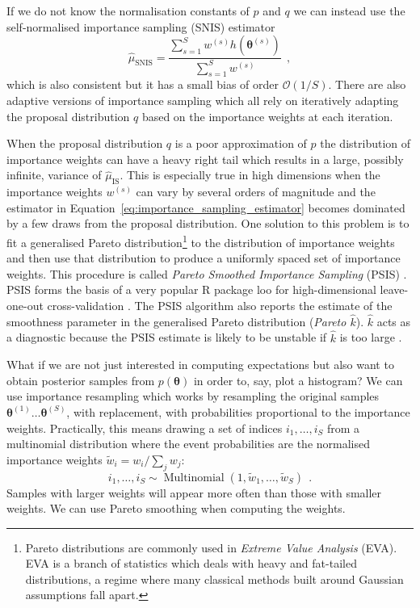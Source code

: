 \documentclass[12pt,dvipsnames]{report}
\newcommand{\ssf}[1]{\textsf{#1}}
\renewcommand{\vec}[1]{\boldsymbol{\mathbf{#1}}}
\newcommand{\hquad}{~~}
\begin{document}
If we do not know the normalisation constants of $p$ and $q$ we can instead use the 
self-normalised importance sampling (SNIS)  estimator 
\begin{equation}
    \hat{\mu}_{\mathrm{SNIS}}=\frac{\sum_{s=1}^{S} w^{(s)} h\left(\boldsymbol{\theta}^{(s)}\right)}{\sum_{s=1}^{S} w^{(s)}}
    \hquad,
\label{eq:importance_sampling_estimator}
\end{equation}
which is also consistent but it has a small bias of order $\mathcal{O}(1/S)$.
There are also adaptive versions of importance sampling  which all rely on iteratively 
adapting the proposal distribution $q$ based on the importance weights at each iteration. 

When the proposal distribution $q$ is a poor approximation of $p$ the distribution of 
importance weights can have a heavy right tail which results in a large,
possibly infinite, variance of $\hat{\mu}_{\mathrm{IS}}$.
This is especially true in high dimensions when the importance weights $w^{(s)}$ can 
vary by several orders of magnitude and the estimator in 
Equation~\ref{eq:importance_sampling_estimator} becomes dominated by a few draws from the
proposal distribution. One solution to this  problem is to fit a generalised 
Pareto distribution\footnote{Pareto distributions are commonly used in \emph{Extreme 
Value Analysis} (EVA). EVA is a branch of statistics which deals with heavy and fat-tailed 
distributions, a regime where many classical methods built around Gaussian assumptions 
fall apart.} 
to the distribution of importance weights and then use that distribution to produce 
a uniformly spaced set of importance weights. This procedure is called 
\emph{Pareto Smoothed Importance Sampling} (PSIS) \citep{arXiv:1507.02646}.
PSIS forms the basis of a very popular \ssf{R} package \ssf{loo} for 
high-dimensional leave-one-out cross-validation \citep{arXiv:1507.04544}.
The PSIS algorithm also reports the estimate of the smoothness parameter in the
generalised Pareto distribution (\emph{Pareto $\hat{k}$}). $\hat{k}$ acts as a 
diagnostic  because the PSIS estimate is likely to be unstable  if $\hat{k}$ is 
too large \citep{arXiv:1507.02646}.

What if we are not just interested in computing expectations but also want to obtain 
posterior samples from $p(\vec{\theta})$ in order to, say, plot a histogram? We can 
use importance resampling which works by resampling the original samples 
$\vec{\theta}^{(1)} \dots \vec{\theta}^{(S)}$,
with replacement, with probabilities proportional to the importance weights.
Practically, this means drawing a set of indices $i_1, \dots, i_S$ from a 
multinomial distribution where the event probabilities are the normalised importance 
weights $\tilde{w}_{i}=w_{i} / \sum_{j} w_{j}$:
\begin{equation}
i_{1}, \ldots, i_{S} \sim \operatorname{Multinomial}\left(1, \tilde{w}_{1}, \ldots, \tilde{w}_{S}\right)
\hquad.
\end{equation}
Samples with larger weights will appear more often than those with smaller weights. 
We can use Pareto smoothing when computing the weights. 
\end{document}
